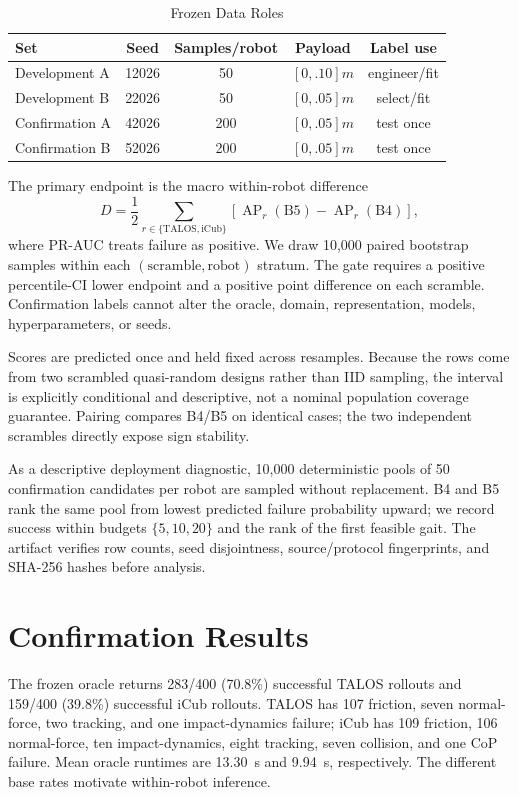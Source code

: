 \documentclass[letterpaper,10pt,conference]{IEEEtran}
\newcommand{\talossuccess}{283/400 (70.8\%)}
\newcommand{\icubsuccess}{159/400 (39.8\%)}
\begin{document}
\begin{table}[t]
\caption{Frozen Data Roles}
\label{tab:data}
\centering
\footnotesize
\setlength{\tabcolsep}{2.6pt}
\begin{tabular}{@{}lcccc@{}}
\toprule
Set & Seed & Samples/robot & Payload & Label use \\
\midrule
Development A & 12026 & 50  & $[0,.10]m$ & engineer/fit \\
Development B & 22026 & 50  & $[0,.05]m$ & select/fit \\
Confirmation A & 42026 & 200 & $[0,.05]m$ & test once \\
Confirmation B & 52026 & 200 & $[0,.05]m$ & test once \\
\bottomrule
\end{tabular}
\end{table}

The primary endpoint is the macro within-robot difference
\begin{equation}
D=\frac{1}{2}\sum_{r\in\{\mathrm{TALOS,iCub}\}}
\left[\operatorname{AP}_r(\mathrm{B5})-\operatorname{AP}_r(\mathrm{B4})\right],
\end{equation}
where PR-AUC treats failure as positive. We draw 10,000 paired bootstrap
samples within each $(\text{scramble},\text{robot})$ stratum. The gate requires
a positive percentile-CI lower endpoint and a positive point difference on
each scramble. Confirmation labels cannot alter the oracle, domain,
representation, models, hyperparameters, or seeds.

Scores are predicted once and held fixed across resamples. Because the rows
come from two scrambled quasi-random designs rather than IID sampling, the
interval is explicitly conditional and descriptive, not a nominal population
coverage guarantee. Pairing compares B4/B5 on identical cases; the two
independent scrambles directly expose sign stability.

As a descriptive deployment diagnostic, 10,000 deterministic pools of 50
confirmation candidates per robot are sampled without replacement. B4 and B5
rank the same pool from lowest predicted failure probability upward; we record
success within budgets $\{5,10,20\}$ and the rank of the first feasible gait.
The artifact verifies row counts, seed disjointness, source/protocol
fingerprints, and SHA-256 hashes before analysis.

\section{Confirmation Results}
The frozen oracle returns \talossuccess{} successful TALOS rollouts and
\icubsuccess{} successful iCub rollouts. TALOS has 107 friction, seven
normal-force, two tracking, and one impact-dynamics failure; iCub has 109
friction, 106 normal-force, ten impact-dynamics, eight tracking, seven
collision, and one CoP failure. Mean oracle runtimes are 13.30~s and 9.94~s,
respectively. The different base rates motivate within-robot inference.
\end{document}
